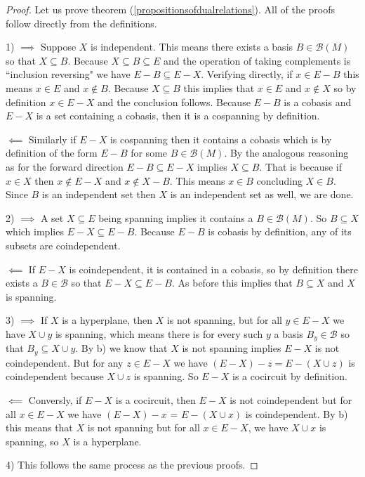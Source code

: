 \begin{proof}
    Let us prove theorem (\ref{propositionsofdualrelations}). All of the proofs follow directly from the definitions.

    1) $\implies$ Suppose $X$ is independent. This means there exists a basis $B \in \mathcal{B}(M)$ so that $X \subseteq B$. Because $X \subseteq B \subseteq E$ and the operation of taking complements is ``inclusion reversing" we have $E-B \subseteq E - X$. Verifying directly, if $x \in E - B$ this means $x \in E$ and $x \notin B$. Because $X \subseteq B$ this implies that $x \in E$ and $x \notin X$ so by definition $x \in E - X$ and the conclusion follows. Because $E - B$ is a cobasis and $E - X$ is a set containing a cobasis, then it is a cospanning by definition.

    $\impliedby$ Similarly if $E - X$ is cospanning then it contains a cobasis which is by definition of the form $E - B$ for some $B \in \mathcal{B}(M)$. By the analogous reasoning as for the forward direction $E - B \subseteq E - X$ implies $X \subseteq B$. That is because if $x \in X$ then $x \notin E - X$ and $x \notin X - B$. This means $x \in B$ concluding $X \in B$. Since $B$ is an independent set then $X$ is an independent set as well, we are done.

    2) $\implies$ A set $X\subseteq E$ being spanning implies it contains a $B \in \mathcal{B}(M)$. So  $B \subseteq X$ which implies $E - X \subseteq E - B$. Because $E - B$ is cobasis by definition, any of its subsets are coindependent. 

    $\impliedby$ If $E - X$ is coindependent, it is contained in a cobasis, so by definition there exists a $B \in \mathcal{B}$ so that $E - X \subseteq E - B$. As before this implies that $B \subseteq X$ and $X$ is spanning.

    3)  $\implies$ If $X$ is a hyperplane, then $X$ is not spanning, but for all $y \in E - X$ we have $X \cup y$ is spanning, which means there is for every such $y$ a basis $B_y \in \mathcal{B}$ so that $B_y \subseteq X \cup y $. By b) we know that $X$ is not spanning implies $E - X$ is not coindependent. But for any $z \in E - X$ we have $(E-X)-z = E - (X \cup z)$ is coindependent because $X \cup z$ is spanning. So $E - X$ is a cocircuit by definition.

    $\impliedby$ Conversly, if $E - X$ is a cocircuit, then $E-X$ is not coindependent but for all $x \in E - X$ we have $(E - X) - x$ = $E - (X \cup x)$ is coindependent. By b) this means that $X$ is not spanning but for all $x \in E-X$, we have $X \cup x$ is spanning, so $X$ is a hyperplane.

    4) This follows the same process as the previous proofs.
\end{proof}

